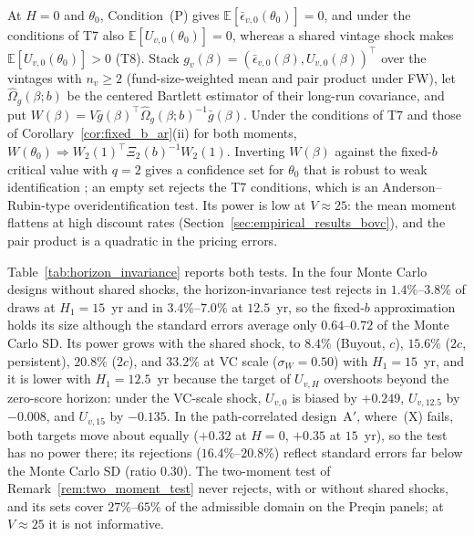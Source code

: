 \begin{remark}
\label{rem:two_moment_test}
At $H = 0$ and $\theta_0$, Condition~(P) gives $\mathbb{E}[\bar\epsilon_{v,0}(\theta_0)] = 0$, and under the conditions of T7 also $\mathbb{E}[U_{v,0}(\theta_0)] = 0$, whereas a shared vintage shock makes $\mathbb{E}[U_{v,0}(\theta_0)] > 0$ (T8). Stack $g_v(\beta) = (\bar\epsilon_{v,0}(\beta), U_{v,0}(\beta))^\top$ over the vintages with $n_v \ge 2$ (fund-size-weighted mean and pair product under FW), let $\hat\Omega_g(\beta; b)$ be the centered Bartlett estimator of their long-run covariance, and put $W(\beta) = V\bar{g}(\beta)^\top\hat\Omega_g(\beta;b)^{-1}\bar{g}(\beta)$. Under the conditions of T7 and those of Corollary~\ref{cor:fixed_b_ar}(ii) for both moments, $W(\theta_0) \Rightarrow W_2(1)^\top\Xi_2(b)^{-1}W_2(1)$. Inverting $W(\beta)$ against the fixed-$b$ critical value with $q=2$ gives a confidence set for $\theta_0$ that is robust to weak identification \citep{AR49,SW00}; an empty set rejects the T7 conditions, which is an Anderson--Rubin-type overidentification test. Its power is low at $V \approx 25$: the mean moment flattens at high discount rates (Section~\ref{sec:empirical_results_bovc}), and the pair product is a quadratic in the pricing errors.
\end{remark}

Table~\ref{tab:horizon_invariance} reports both tests. In the four Monte Carlo designs without shared shocks, the horizon-invariance test rejects in $1.4\%$--$3.8\%$ of draws at $H_1 = 15$~yr and in $3.4\%$--$7.0\%$ at $12.5$~yr, so the fixed-$b$ approximation holds its size although the standard errors average only $0.64$--$0.72$ of the Monte Carlo SD. Its power grows with the shared shock, to $8.4\%$ (Buyout, $c$), $15.6\%$ ($2c$, persistent), $20.8\%$ ($2c$), and $33.2\%$ at VC scale ($\sigma_W = 0.50$) with $H_1 = 15$~yr, and it is lower with $H_1 = 12.5$~yr because the target of $U_{v,H}$ overshoots beyond the zero-score horizon: under the VC-scale shock, $U_{v,0}$ is biased by $+0.249$, $U_{v,12.5}$ by $-0.008$, and $U_{v,15}$ by $-0.135$. In the path-correlated design~A$'$, where~(X) fails, both targets move about equally ($+0.32$ at $H=0$, $+0.35$ at $15$~yr), so the test has no power there; its rejections ($16.4\%$--$20.8\%$) reflect standard errors far below the Monte Carlo SD (ratio $0.30$). The two-moment test of Remark~\ref{rem:two_moment_test} never rejects, with or without shared shocks, and its sets cover $27\%$--$65\%$ of the admissible domain on the Preqin panels; at $V \approx 25$ it is not informative.

